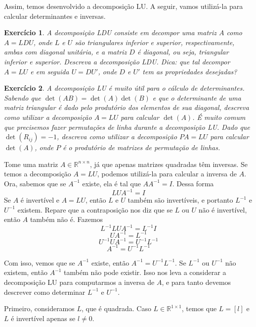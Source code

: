 \documentclass[]{article}
\newtheorem{exercicio}{Exercício}
\numberwithin{equation}{section}
\begin{document}
Assim, temos desenvolvido a decomposição LU. A seguir, vamos utilizá-la para calcular determinantes e inversas.

\begin{exercicio}
	A decomposição LDU consiste em decompor uma matriz $A$ como $A = LDU$, onde $L$ e $U$ são triangulares inferior e superior, respectivamente, ambas com diagonal unitária, e a matriz $D$ é diagonal, ou seja, triangular inferior e superior. Descreva a decomposição LDU. Dica: que tal decompor $A = LU$ e em seguida $U = DU'$, onde $D$ e $U'$ tem as propriedades desejadas?
\end{exercicio}

\begin{exercicio}
	A decomposição LU é muito útil para o cálculo de determinantes. Sabendo que $\det(AB) = \det(A) \det(B)$ e que o determinante de uma matriz triangular é dado pelo produtório dos elementos de sua diagonal, descreva como utilizar a decomposição $A = LU$ para calcular $\det(A)$. É muito comum que precisemos fazer permutações de linha durante a decomposição LU. Dado que $\det(R_{ij}) = -1$, descreva como utilizar a decomposição $PA = LU$ para calcular $\det(A)$, onde $P$ é o produtório de matrizes de permutação de linhas.
\end{exercicio}

Tome uma matriz $A \in \mathbb{R}^{n \times n}$, já que apenas matrizes quadradas têm inversas. Se temos a decomposição $A = LU$, podemos utilizá-la para calcular a inversa de $A$. Ora, sabemos que se $A^{-1}$ existe, ela é tal que $AA^{-1} = I$. Dessa forma
$$
LUA^{-1} = I
$$
Se $A$ é invertível e $A = LU$, então $L$ e $U$ também são invertíveis, e portanto $L^{-1}$ e $U^{-1}$ existem. Repare que a contraposição nos diz que se $L$ ou $U$ não é invertível, então $A$ também não é. Fazemos
$$
L^{-1}LUA^{-1} = L^{-1}I
$$
$$
UA^{-1} = L^{-1}
$$
$$
U^{-1}UA^{-1} = U^{-1}L^{-1}
$$
$$
A^{-1} = U^{-1}L^{-1}
$$

Com isso, vemos que se $A^{-1}$ existe, então $A^{-1} = U^{-1}L^{-1}$. Se $L^{-1}$ ou $U^{-1}$ não existem, então $A^{-1}$ também não pode existir. Isso nos leva a considerar a decomposição LU para computarmos a inversa de $A$, e para tanto devemos descrever como determinar $L^{-1}$ e $U^{-1}$.

Primeiro, consideramos $L$, que é quadrada. Caso $L \in \mathbb{R}^{1 \times 1}$, temos que $L = [l]$ e $L$ é invertível apenas se $l \neq 0$.
\end{document}
